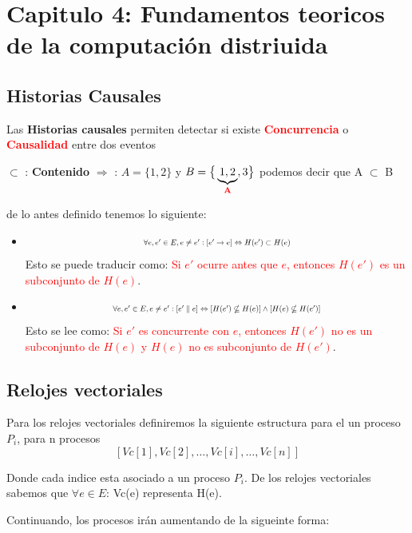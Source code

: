 \section{Capitulo 4: Fundamentos teoricos de la computación distriuida}
\subsection{Historias Causales}
Las \textbf{Historias causales} permiten detectar si existe \textcolor{red}{\textbf{Concurrencia}} o \textcolor{red}{\textbf{Causalidad}} entre dos eventos

\begin{center}
    $\subset$ : \textbf{Contenido} $\Rightarrow$ : $A=\{1,2\}$ y $B=\big\{\underbrace{1,2}_{\textcolor{red}{\textbf{A}}},3\big\}$ podemos decir que A $\subset$ B
\end{center}

de lo antes definido tenemos lo siguiente:

\begin{itemize}

    \item 
    \[
    \scalebox{0.70}{$\forall e, e' \in E, e \neq e' : [e' \rightarrow e] \Leftrightarrow H(e') \subset H(e)$}
    \]
    Esto se puede traducir como: \textcolor{red}{Si $e'$ ocurre antes que $e$, entonces $H(e')$ es un subconjunto de $H(e)$}.

    \item 
    \[
    \scalebox{0.70}{$\forall e, e' \in E, e \neq e' : [e' \parallel e] \Leftrightarrow [H(e') \nsubseteq H(e)] \land [H(e) \nsubseteq H(e') ]$}
    \]
    Esto se lee como: \textcolor{red}{Si $e'$ es concurrente con $e$, entonces $H(e')$ no es un subconjunto de $H(e)$ y $H(e)$ no es subconjunto de $H(e')$}.

\end{itemize}


\subsection{Relojes vectoriales}
Para los relojes vectoriales definiremos la siguiente estructura para el un proceso $P_i$, para n procesos
\[
   \left[ \mathit{Vc}[1], \mathit{Vc}[2], \dots, \mathit{Vc}[i], \dots, \mathit{Vc}[n] \right]
\]

Donde cada indice esta asociado a un proceso $P_i$. De los relojes vectoriales sabemos que $\forall e \in E$: Vc(e) representa H(e).

Continuando, los procesos irán aumentando de la sigueinte forma:

